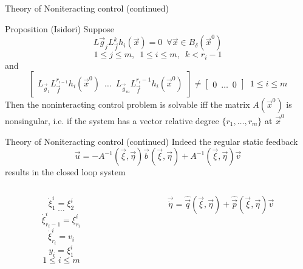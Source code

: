 \begin{frame}{Theory of Noniteracting control (continued)}
  \begin{block}{Proposition (Isidori)}
    Suppose
    \[
    L{\vec{g}_j}L_{\vec{f}}^{k}h_{i}(\vec{x}) = 0 \enspace \forall \vec{x} \in B_{\delta}(\vec{x}^0)
    \]
    \[
    1 \le j \le m, \enspace 1 \le i \le m, \enspace k < r_i-1
    \]
    and
    \[
    \begin{bmatrix}
      L_{\vec{g}_1}L_{\vec{f}}^{r_{i-1}}h_i(\vec{x}^{0}) \enspace \hdots \enspace L_{\vec{g}_m}L_{\vec{f}}^{r_i-1}h_i(\vec{x}^{0})
    \end{bmatrix}
    \ne
    \begin{bmatrix}
      0 \enspace \hdots \enspace 0
    \end{bmatrix}
    \enspace 1 \le i \le m
    \]
    Then the noninteracting control problem is solvable iff the matrix $A(\vec{x}^{0})$ is nonsingular,
    i.e. if the system has a vector relative degree $\{r_1, \hdots, r_m\}$ at $\vec{x}^{0}$
  \end{block}
\end{frame}

\begin{frame}{Theory of Noniteracting control (continued)}
  Indeed the regular static feedback
  \[
  \vec{u} = -A^{-1}(\vec{\xi},\vec{\eta})\vec{b}(\vec{\xi},\vec{\eta}) + A^{-1}(\vec{\xi},\vec{\eta})\vec{v}
  \]
  results in the closed loop system
  \begin{columns}[t]
    \begin{column}{0.5\textwidth}
      \[
      \dot{\xi}_{1}^{i} = \xi_{2}^{i}
      \]
      \[
      \hdots
      \]
      \[
      \dot{\xi}_{r_{i}-1}^{i} = \xi_{r_{i}}^{i}
      \]
      \[
      \dot{\xi}_{r_{i}}^{i} = v_{i}
      \]
      \[
      y_{i} = \xi_{1}^{i}
      \]
      \[
      1 \le i \le m
      \]
    \end{column}
    \begin{column}{0.5\textwidth}
      \[
      \vec{\dot{\eta}}  = \hat{\vec{q}}(\vec{\xi},\vec{\eta}) + \hat{\vec{p}}(\vec{\xi},\vec{\eta})\vec{v}
      \]
    \end{column}
  \end{columns}
\end{frame}

